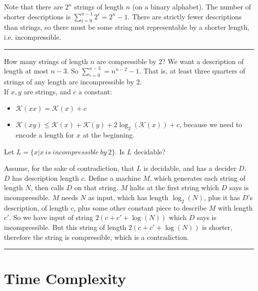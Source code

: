 \documentclass[twoside]{article}
\newenvironment{proof}{{\bf Proof:}}{\hfill\rule{2mm}{2mm}}
\begin{document}
\begin{proof}
	Note that there are $2^n$ strings of length $n$ (on a binary alphabet).  The number of shorter descriptions is $\sum\limits_{i=0}^{n-1} 2^i = 2^n - 1$.  There are strictly fewer descriptions than strings, so there must be some string not representable by a shorter length, i.e. incompressible.
	
\end{proof}

How many strings of length $n$ are compressible by 2?  We want a description of length at most $n-3$.  So $\sum\limits_{i=0}^{n-3} = n^{n-2} -1$.  That is, at least three quarters of strings of any length are incompressible by 2.\\

If $x,y$ are strings, and $c$ a constant:  
\begin{itemize}
\item $\mathcal{K}(xx) = \mathcal{K}(x) + c$
\item $\mathcal{K}(xy) \leq \mathcal{K}(x) + \mathcal{K}(y) + 2\log_2(\mathcal{K}(x)) + c$, because we need to encode a length for $x$ at the beginning.
\end{itemize}

Let $L = \{ x | x \ is \ incompressible \ by \ 2\}$.  Is $L$ decidable?


\begin{proof}
	
	Assume, for the sake of contradiction, that $L$ is decidable, and has a decider $D$.  $D$ has description length $c$.  Define a machine $M$, which generates each string of length $N$, then calls $D$ on that string.  $M$ halts at the first string which $D$ says is incompressible.  $M$ needs $N$ as input, which has length $\log_2(N)$, plus it has $D$'s description, of length $c$, plus some other constant piece to describe $M$ with length $c'$.  So we have input of string $2(c+c'+\log(N))$ which $D$ says is incompressible.  But this string of length $2(c+c'+\log(N))$ is shorter, therefore the string is compressible, which is a contradiction.
	
	
	
\end{proof}

\section*{Time Complexity}

\end{document}
